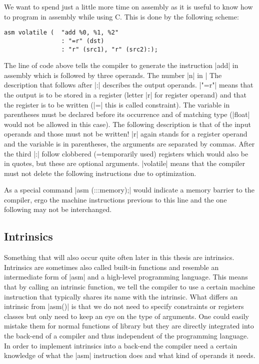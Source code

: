 
We want to spend just a little more time on assembly as it is useful to know how to program in assembly while using C.
This is done by the following scheme:
\begin{lstlisting}
asm volatile (  "add %0, %1, %2"
                : "=r" (dst)
                : "r" (src1), "r" (src2):);
\end{lstlisting}

The line of code above tells the compiler to generate the instruction |add| in assembly which is followed by three operands.
The number |n| in |%
The description that follows after |:| describes the output operands.
|"=r"| means that the output is to be stored in a register (letter |r| for register operand) and that the register is to be written (|=| this is called constraint).
The variable in parentheses must be declared before its occurrence and of matching type (|float| would not be allowed in this case).
The following description is that of the input operands and those must not be written!
|r| again stands for a register operand and the variable is in parentheses, the arguments are separated by commas.
After the third |:| follow clobbered (=temporarily used) registers which would also be in quotes, but these are optional arguments.
|volatile| means that the compiler must not delete the following instructions due to optimization.

As a special command |asm (:::memory);| would indicate a memory barrier to the compiler, ergo the machine instructions previous to this line and the one following may not be interchanged.

\subsection{Intrinsics}
Something that will also occur quite often later in this thesis are intrinsics.
Intrinsics are sometimes also called built-in functions and resemble an intermediate form of |asm| and a high-level programming language.
This means that by calling an intrinsic function, we tell the compiler to use a certain machine instruction that typically shares its name with the intrinsic.
What differs an intrinsic from |asm()| is that we do not need to specify constraints or registers classes but only need to keep an eye on the type of arguments.
One could easily mistake them for normal functions of library but they are directly integrated into the back-end of a compiler and thus independent of the programming language.
In order to implement intrinsics into a back-end the compiler need a certain knowledge of what the |asm| instruction does and what kind of operands it needs.

